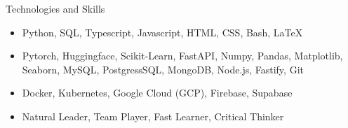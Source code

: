 \documentclass[]{mcdowellcv}
\begin{document}
	\begin{cvsection}{Technologies and Skills}
		\begin{cvsubsection}{}{}{}	
			\begin{itemize}
				\item Python, SQL, Typescript, Javascript, HTML, CSS, Bash, \LaTeX
				\item Pytorch, Huggingface, Scikit-Learn, FastAPI, Numpy, Pandas, Matplotlib, Seaborn, MySQL, PostgressSQL, MongoDB, Node.js, Fastify, Git
				\item Docker, Kubernetes, Google Cloud (GCP), Firebase, Supabase
				\item Natural Leader, Team Player, Fast Learner, Critical Thinker
			\end{itemize}
		\end{cvsubsection}
	\end{cvsection}
	
\end{document}
